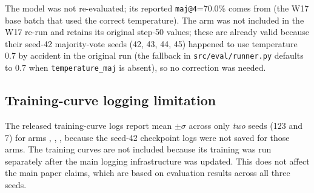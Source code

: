 The \base{} model was not re-evaluated; its reported \texttt{maj@4}=70.0\%
comes from  (the W17 base batch that used the
correct temperature).  The \armD{} arm was not included in the W17 re-run
and retains its original step-50 values; these are already valid because
their seed-42 majority-vote seeds (42, 43, 44, 45) happened to use
temperature 0.7 by accident in the original run (the fallback in
\texttt{src/eval/runner.py} defaults to 0.7 when
\texttt{temperature\_maj} is absent), so no correction was needed.

\subsection{Training-curve logging limitation}
The released training-curve logs report mean $\pm \sigma$ across only
\emph{two} seeds (123 and 7) for
arms \armA{}, \armB{}, \armC{}, because the seed-42 checkpoint logs were not
saved for those arms.  The \armD{} training curves are not included because
its training was run separately after the main logging infrastructure was
updated.  This does not affect the main paper claims, which are based on
evaluation results across all three seeds.
